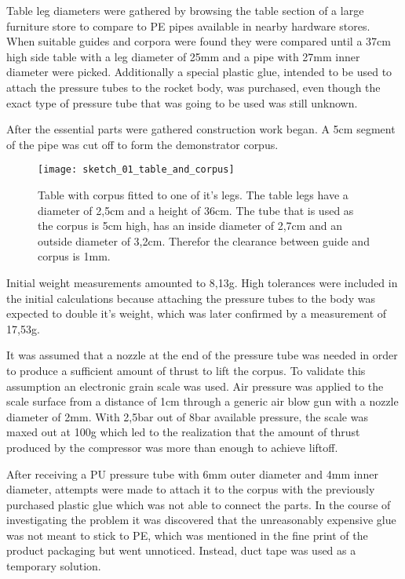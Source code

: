 
Table leg diameters were gathered by browsing the table section of a large furniture store to compare to PE pipes available in nearby hardware stores. When suitable guides and corpora were found they were compared until a 37cm high side table \cite{table} with a leg diameter of 25mm and a pipe with 27mm inner diameter were picked. Additionally a special plastic glue, intended to be used to attach the pressure tubes to the rocket body, was purchased, even though the exact type of pressure tube that was going to be used was still unknown.

After the essential parts were gathered construction work began. A 5cm segment of the pipe was cut off to form the demonstrator corpus.

\begin{figure}[hp]
\centering

\texttt{[image: sketch\_01\_table\_and\_corpus]}

\caption{Table with corpus fitted to one of it's legs. The table legs have a diameter of 2,5cm and a height of 36cm. The tube that is used as the corpus is 5cm high, has an inside diameter of 2,7cm and an outside diameter of 3,2cm. Therefor the clearance between guide and corpus is 1mm.}
\end{figure}


Initial weight measurements amounted to 8,13g. High tolerances were included in the initial calculations because attaching the pressure tubes to the body was expected to double it's weight, which was later confirmed by a measurement of 17,53g.

It was assumed that a nozzle at the end of the pressure tube was needed in order to produce a sufficient amount of thrust to lift the corpus.
To validate this assumption an electronic grain scale was used. Air pressure was applied to the scale surface from a distance of 1cm through a generic air blow gun with a nozzle diameter of 2mm. With 2,5bar out of 8bar available pressure, the scale was maxed out at 100g which led to the realization that the amount of thrust produced by the compressor was more than enough to achieve liftoff. 

After receiving a PU pressure tube with 6mm outer diameter and 4mm inner diameter, attempts were made to attach it to the corpus with the previously purchased plastic glue which was not able to connect the parts. In the course of investigating the problem it was discovered that the unreasonably expensive glue was not meant to stick to PE, which was mentioned in the fine print of the product packaging but went unnoticed. Instead, duct tape was used as a temporary solution. 
\newpage

